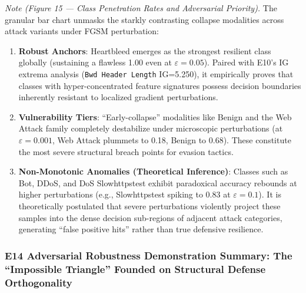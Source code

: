 \documentclass[sigconf]{acmart}
\begin{document}
\textit{Note (Figure 15 --- Class Penetration Rates and Adversarial Priority).} The granular bar chart unmasks the starkly contrasting collapse modalities across attack variants under FGSM perturbation:
\begin{enumerate}
\item \textbf{Robust Anchors}: Heartbleed emerges as the strongest resilient class globally (sustaining a flawless 1.00 even at $\varepsilon=0.05$). Paired with E10's IG extrema analysis (\texttt{Bwd Header Length} IG=5.250), it empirically proves that classes with hyper-concentrated feature signatures possess decision boundaries inherently resistant to localized gradient perturbations.
\item \textbf{Vulnerability Tiers}: ``Early-collapse'' modalities like Benign and the Web Attack family completely destabilize under microscopic perturbations (at $\varepsilon=0.001$, Web Attack plummets to 0.18, Benign to 0.68). These constitute the most severe structural breach points for evasion tactics.
\item \textbf{Non-Monotonic Anomalies (Theoretical Inference)}: Classes such as Bot, DDoS, and DoS Slowhttpstest exhibit paradoxical accuracy rebounds at higher perturbations (e.g., Slowhttpstest spiking to 0.83 at $\varepsilon=0.1$). It is theoretically postulated that severe perturbations violently project these samples into the dense decision sub-regions of adjacent attack categories, generating ``false positive hits'' rather than true defensive resilience.
\end{enumerate}

\subsubsection*{E14 Adversarial Robustness Demonstration Summary: The ``Impossible Triangle'' Founded on Structural Defense Orthogonality}
\end{document}

